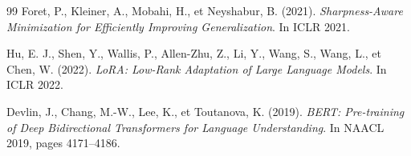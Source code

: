 \documentclass[12pt,a4paper]{article}
\begin{document}
\begin{thebibliography}{99}
Foret, P., Kleiner, A., Mobahi, H., et Neyshabur, B. (2021).
\textit{Sharpness-Aware Minimization for Efficiently Improving Generalization}.
In ICLR 2021.

Hu, E. J., Shen, Y., Wallis, P., Allen-Zhu, Z., Li, Y., Wang, S.,
Wang, L., et Chen, W. (2022).
\textit{LoRA: Low-Rank Adaptation of Large Language Models}.
In ICLR 2022.

Devlin, J., Chang, M.-W., Lee, K., et Toutanova, K. (2019).
\textit{BERT: Pre-training of Deep Bidirectional Transformers for Language Understanding}.
In NAACL 2019, pages 4171–4186.

\end{thebibliography}
\end{document}
